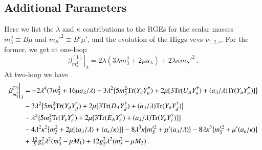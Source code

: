\documentclass[final,3p,times,pdflatex]{elsarticle}
\newcommand{\lamsq}{\lambda^2}
\newcommand{\kapsq}{\kappa^2}
\newcommand{\tr}{\mathrm{Tr}}
\newcommand{\mtrisq}{m_3^2}
\newcommand{\msprsq}{m_S'^2}
\begin{document}
\subsection{Additional Parameters}
Here we list the $\lambda$ and $\kappa$ contributions to the RGEs for the scalar masses $\mtrisq \equiv B\mu$ and $\msprsq \equiv B'\mu'$, and the evolution of the Higgs vevs $v_{1,2,s}$.  For the former, we get at one-loop
%
\begin{equation}
\left.\beta_{\mtrisq}^{(1)}\right|_\lambda = 2\lambda(3\lambda\mtrisq + 2\mu a_\lambda) + 2\lambda\kappa\msprsq\,.
\end{equation}
%
At two-loop we have
%
\begin{align}
\left.\beta_{\mtrisq}^{(2)}\right|_\lambda &= -2\lambda^4(7\mtrisq + 16\mu a_\lambda/\lambda) -3\lamsq\big\{ 5\mtrisq\tr( Y_u Y_u^\dagger) 
+ 2\mu[3\tr( U_A Y_u^\dagger) + (a_\lambda/\lambda)\tr( Y_u Y_u^\dagger)] \big\} \notag \\
%
&-3\lamsq\big\{ 5\mtrisq\tr( Y_d Y_d^\dagger) + 2\mu[3\tr( D_A Y_d^\dagger) 
+ (a_\lambda/\lambda)\tr( Y_d Y_d^\dagger) \big\} \notag \\
%
&-\lamsq\big\{5\mtrisq\tr( Y_e Y_e^\dagger) 
+ 2\mu[3\tr( E_A Y_e^\dagger) + (a_\lambda/\lambda)\tr( Y_e Y_e^\dagger)] \big\} \notag \\
%
&-4\lamsq\kapsq\big\{ \mtrisq + 2\mu[(a_\lambda/\lambda) + (a_\kappa/\kappa)] \big\} 
-8\lambda^3\kappa\big\{ m_S'^2 + \mu'(a_\lambda/\lambda)\big\} - 8\lambda\kappa^3\big\{m_S'^2 + \mu'(a_\kappa/\kappa)\big\} \notag \\
%
&+\tfrac{12}{5}g_1^2\lamsq(\mtrisq - \mu M_1) + 12g_2^2\lamsq(\mtrisq -\mu M_2) \,.
\end{align}
\end{document}
